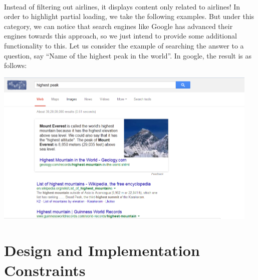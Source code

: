\documentclass[a4paper]{report}
\begin{document}
\paragraph{}
\large\textnormal{Instead of filtering out airlines, it displays content only related to airlines! In order to highlight partial loading, we take the following examples. But under this category, we can notice that search engines like Google has advanced their engines towards this approach, so we just intend to provide some additional functionality to this. Let us consider the example of searching the answer to a question, say “Name of the highest peak in the world”. In google, the result is as follows:}

\vspace{0.3cm}
\includegraphics[width=5in]{3.png} 
\vspace{0.1cm}

\section{Design and Implementation Constraints}
\end{document}
